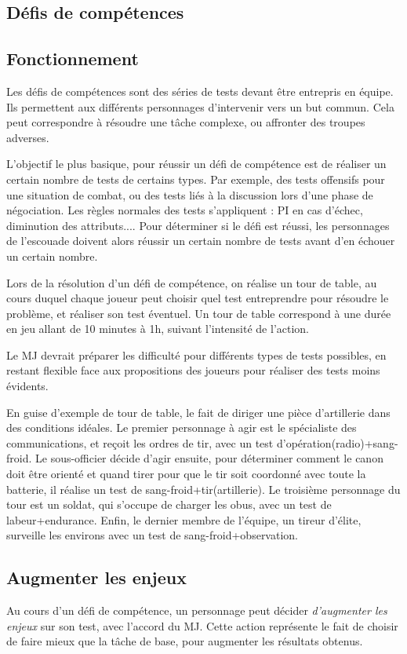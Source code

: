\documentclass{report}
\begin{document}
\begin{multicols}{2}
\section{Défis de compétences}
\subsection{Fonctionnement}
Les défis de compétences sont des séries de tests devant être entrepris en équipe. Ils permettent aux différents personnages d'intervenir vers un but commun. Cela peut correspondre à résoudre une tâche complexe, ou affronter des troupes adverses.

L'objectif le plus basique, pour réussir un défi de compétence est de réaliser un certain nombre de tests de certains types. Par exemple, des tests offensifs pour une situation de combat, ou des tests liés à la discussion lors d'une phase de négociation. Les règles normales des tests s'appliquent : PI en cas d'échec, diminution des attributs.... Pour déterminer si le défi est réussi, les personnages de l'escouade doivent alors réussir un certain nombre de tests avant d'en échouer un certain nombre.

Lors de la résolution d'un défi de compétence, on réalise un tour de table, au cours duquel chaque joueur peut choisir quel test entreprendre pour résoudre le problème, et réaliser son test éventuel. Un tour de table correspond à une durée en jeu allant de 10 minutes à 1h, suivant l'intensité de l'action.

Le MJ devrait préparer les difficulté pour différents types de tests possibles, en restant flexible face aux propositions des joueurs pour réaliser des tests moins évidents.

En guise d'exemple de tour de table, le fait de diriger une pièce d'artillerie dans des conditions idéales. Le premier personnage à agir est le spécialiste des communications, et reçoit les ordres de tir, avec un test d'opération(radio)+sang-froid. Le sous-officier décide d'agir ensuite, pour déterminer comment le canon doit être orienté et quand tirer pour que le tir soit coordonné avec toute la batterie, il réalise un test de sang-froid+tir(artillerie). Le troisième personnage du tour est un soldat, qui s'occupe de charger les obus, avec un test de labeur+endurance. Enfin, le dernier membre de l'équipe, un tireur d'élite, surveille les environs avec un test de sang-froid+observation.
\subsection{Augmenter les enjeux}
Au cours d'un défi de compétence, un personnage peut décider \emph{d'augmenter les enjeux} sur son test, avec l'accord du MJ. Cette action représente le fait de choisir de faire mieux que la tâche de base, pour augmenter les résultats obtenus.


\end{multicols}
\end{document}

